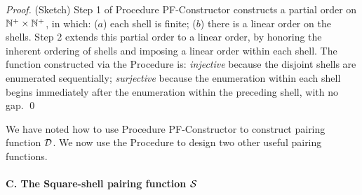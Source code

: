 \begin{proof}(Sketch) Step 1 of Procedure {\small\sf PF-Constructor}
constructs a partial order on $\mathbb{N}^+ \times \mathbb{N}^+$, in which: ($a$) each
shell is finite; ($b$) there is a linear order on the shells.  Step 2
extends this partial order to a linear order, by honoring the inherent
ordering of shells and imposing a linear order within each shell.  The
function constructed via the Procedure is: {\em injective} because the
disjoint shells are enumerated sequentially; {\em surjective} because
the enumeration within each shell begins immediately after the
enumeration within the preceding shell, with no gap.  \qed
\end{proof}

\bigskip

We have noted how to use Procedure {\small\sf PF-Constructor} to
construct pairing function $\mbox{$\cal D$}$.  We now use the Procedure to design
two other useful pairing functions.

\paragraph{\small\sf C. The Square-shell pairing function $\mbox{$\cal S$}$}

